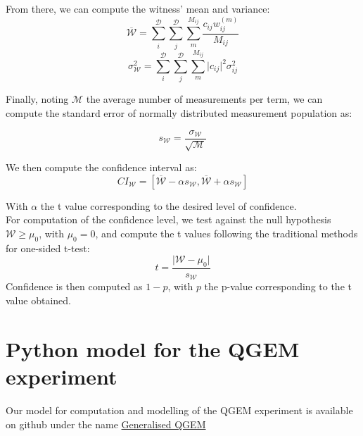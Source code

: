 \documentclass[%
 12pt,
 superscriptaddress,
 amsmath,
 amssymb,
 onecolumn,
 longbibliography
]{revtex4-2}
\begin{document}
\begin{appendices}
\indent From there, we can compute the witness' mean and variance:
 \begin{equation}
    \overline{\mathcal{W}} = \sum_i^\mathcal{D} \sum_j^\mathcal{D} \sum_m^{M_{ij}} \frac{c_{ij} w_{ij}^{(m)}}{M_{ij}}
\end{equation}
 \begin{equation}
    \sigma_{\mathcal{W}}^2 = \sum_i^\mathcal{D} \sum_j^\mathcal{D} \sum_m^{M_{ij}} \lvert c_{ij}\rvert^2 \sigma_{ij}^2 
\end{equation}

\indent Finally, noting $\mathcal{M}$ the average number of measurements per term, we can compute the standard error of normally distributed measurement population as:

 \begin{equation}
    s_{\mathcal{W}} = \frac{\sigma_{\mathcal{W}}}{\sqrt{\mathcal{M}}}
\end{equation}

We then compute the confidence interval as: 
 \begin{equation}
    CI_\mathcal{W} = [\overline{\mathcal{W}} - \alpha s_{\mathcal{W}}, \overline{\mathcal{W}} + \alpha s_{\mathcal{W}}  ]
\end{equation}

\indent With $\alpha$ the t value corresponding to the desired level of confidence. \\
\indent For computation of the confidence level, we test against the null hypothesis $\mathcal{W} \ge \mu_0$, with $\mu_0 = 0$, and compute the t values following the traditional methods for one-sided t-test: 
 \begin{equation}
    t =\frac{\lvert \mathcal{W} - \mu_0 \rvert }{s_{\mathcal{W}}}
\end{equation}
\indent Confidence is then computed as $1 - p$, with $p$ the p-value corresponding to the t value obtained. \\

\section{Python model for the QGEM experiment} \label{sec:python}

\indent Our model for computation and modelling of the QGEM experiment is available on github under the name \href{https://github.com/JT76/Generalised_QGEM}{Generalised QGEM}



\end{appendices}
\end{document}
